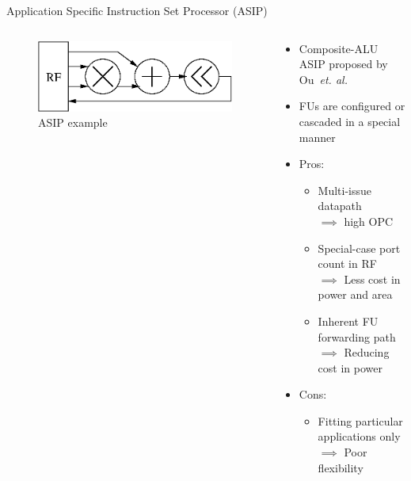 \documentclass{beamer}
\begin{document}
\begin{CJK}{UTF8}{bkai}
    \begin{frame}{Application Specific Instruction Set Processor (ASIP)}
        \begin{columns}
            \begin{column}{0.45\textwidth}
                \begin{figure}[!ht]
                    \centering
                    \includegraphics[width=0.9\linewidth]{./figs/cascade.eps}
                    \caption{ASIP example}
                \end{figure}
            \end{column}
            \begin{column}{0.55\textwidth}
               \begin{itemize}
                   \item Composite-ALU ASIP proposed by Ou~\textit{et. al.}~\cite{cascade}
                   \item FUs are configured or cascaded in a special manner
                   \item Pros:
                       \begin{itemize}
                           \item Multi-issue datapath \\ $\implies$ high OPC
                           \item Special-case port count in RF \\ $\implies$ Less cost in power and area
                           \item Inherent FU forwarding path \\ $\implies$ Reducing cost in power
                       \end{itemize}
                   \item Cons:
                       \begin{itemize}
                           \item Fitting particular applications only \\ $\implies$ Poor flexibility
                       \end{itemize}

\end{itemize}
\end{column}
\end{columns}
\end{frame}
\end{CJK}
\end{document}

